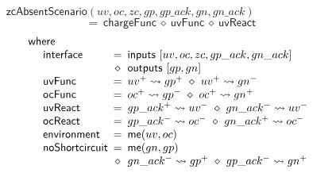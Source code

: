 \documentclass[british, journal]{IEEEtran}
\begin{document}
\vspace{-4mm}
\[
\mathsf{zcAbsentScenario}(uv,oc,zc,gp,gp\_ack,gn,gn\_ack)~~~~~~~~~~~~~~~~~~~~~~~~~~~~~~~
\]
\vspace{-6mm}
\[
~~=~\mathsf{chargeFunc}~\diamond~\mathsf{uvFunc}~\diamond~\mathsf{uvReact}
\]
\vspace{-5mm}
\[
\begin{array}{lcl}
\mathsf{where}&~&\\

~~~~\mathsf{interface}&\hspace{-2mm}=&\hspace{-2mm}\mathsf{inputs}~[uv, oc, zc, gp\_ack, gn\_ack]\\
~&\hspace{-2mm}\diamond&\hspace{-2mm}\mathsf{outputs}~[gp, gn]\\

~~~~\mathsf{uvFunc}&\hspace{-2mm}=&\hspace{-2mm}uv^{+}\rightsquigarrow gp^{+}~\diamond~ uv^{+}\rightsquigarrow gn^{-}\\

~~~~\mathsf{ocFunc}&\hspace{-2mm}=&\hspace{-2mm}oc^{+}\rightsquigarrow gp^{-}~\diamond~ oc^{+}\rightsquigarrow gn^{+}\\

~~~~\mathsf{uvReact}&\hspace{-2mm}=&\hspace{-2mm}gp\_ack^{+}\rightsquigarrow uv^{-}~\diamond~gn\_ack^{-}\rightsquigarrow uv^{-}\\

~~~~\mathsf{ocReact}&\hspace{-2mm}=&\hspace{-2mm}gp\_ack^{-}\rightsquigarrow oc^{-}~\diamond~gn\_ack^{+}\rightsquigarrow oc^{-}\\

~~~~\mathsf{environment}&\hspace{-2mm}=&\hspace{-2mm}\mathsf{me}(uv, oc)\\

~~~~\mathsf{\mathsf{noShortcircuit}}&\hspace{-2mm}=&\hspace{-2mm}\mathsf{me}(gn, gp)\\
~&\hspace{-2mm}\diamond&\hspace{-2mm}gn\_ack^{-}\rightsquigarrow gp^{+}~\diamond~gp\_ack^{-}\rightsquigarrow gn^{+}\\


\end{array}\]
\end{document}
